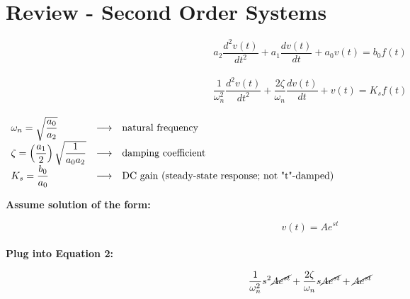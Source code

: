 
%



\section*{Review - Second Order Systems}

 \begin{equation}
 a_2 \dfrac{d^2v(t)}{dt^2} + a_1 \dfrac{dv(t)}{dt} + a_0 v(t) = b_0 f(t)  \end{equation} \\ 

\begin{equation} \dfrac{1}{\omega_n^2} \dfrac{d^2 v(t)}{dt^2} + \dfrac{2\zeta}{\omega_n} \dfrac{dv(t)}{dt} + v(t) = K_s f(t) \end{equation} \\ 

 $\begin{array}{llp{5in}}

\omega_n = \sqrt{\dfrac{a_0}{a_2}} & \longrightarrow & natural frequency  \\

\zeta = \left(\dfrac{a_1}{2}\right) \sqrt{\dfrac{1}{a_0a_2}} & \longrightarrow & damping coefficient \\

K_s = \dfrac{b_0}{a_0} &  \longrightarrow &  DC gain (steady-state response; not "t"-damped) \\

\end{array}$  \\ \vspace{5mm}

{\bf Assume solution of the form:}

\begin{equation} v(t) = Ae^{st} \end{equation} \\

{\bf Plug into Equation 2:}

\begin{equation} \dfrac{1}{\omega_n^2}s^2\cancel{Ae^{st}} + \dfrac{2\zeta}{\omega_n}s \cancel{Ae^{st}} + \cancel{Ae^{st}} \end{equation} \\


